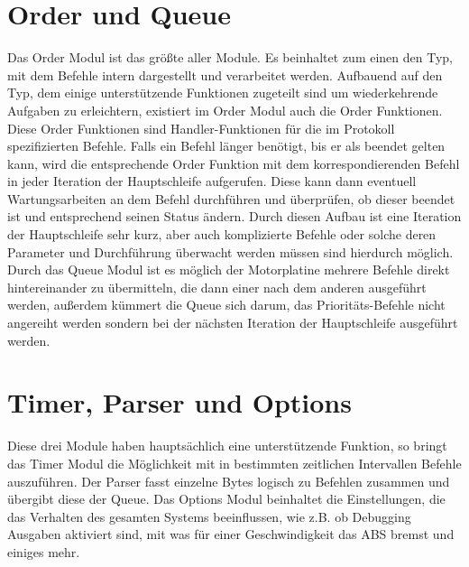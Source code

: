 \section{Order und Queue}
Das Order Modul ist das größte aller Module. Es beinhaltet zum einen den Typ, mit dem Befehle
intern dargestellt und verarbeitet werden. Aufbauend auf den Typ, dem einige unterstützende
Funktionen zugeteilt sind um wiederkehrende Aufgaben zu erleichtern, existiert im Order
Modul auch die Order Funktionen. Diese Order Funktionen sind Handler-Funktionen für die
im Protokoll spezifizierten Befehle. Falls ein Befehl länger benötigt, bis er als beendet
gelten kann, wird die entsprechende Order Funktion mit dem korrespondierenden Befehl in jeder
Iteration der Hauptschleife aufgerufen. Diese kann dann eventuell Wartungsarbeiten an dem
Befehl durchführen und überprüfen, ob dieser beendet ist und entsprechend seinen Status ändern.
Durch diesen Aufbau ist eine Iteration der Hauptschleife sehr kurz, aber auch komplizierte Befehle
oder solche deren Parameter und Durchführung überwacht werden müssen sind hierdurch möglich.\\
Durch das Queue Modul ist es möglich der Motorplatine mehrere Befehle direkt hintereinander
zu übermitteln, die dann einer nach dem anderen ausgeführt werden, außerdem kümmert die
Queue sich darum, das Prioritäts-Befehle nicht angereiht werden sondern bei der nächsten
Iteration der Hauptschleife ausgeführt werden.
\section{Timer, Parser und Options}
Diese drei Module haben hauptsächlich eine unterstützende Funktion, so bringt das Timer Modul
die Möglichkeit mit in bestimmten zeitlichen Intervallen Befehle auszuführen. Der Parser
fasst einzelne Bytes logisch zu Befehlen zusammen und übergibt diese der Queue. Das Options
Modul beinhaltet die Einstellungen, die das Verhalten des gesamten Systems beeinflussen, wie
z.B. ob Debugging Ausgaben aktiviert sind, mit was für einer Geschwindigkeit das ABS bremst
und einiges mehr.
